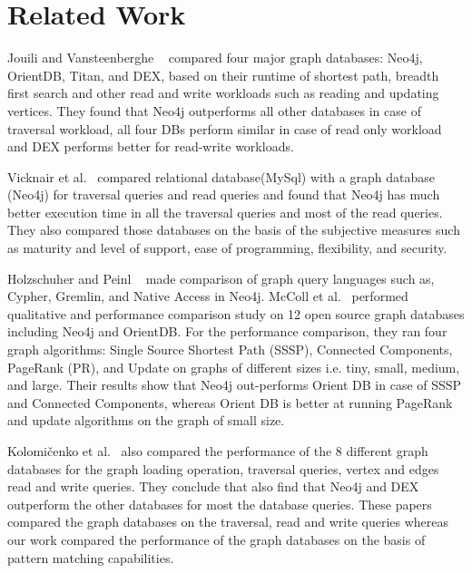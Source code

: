 
\section{Related Work}

Jouili and Vansteenberghe ~\cite{jouili2013empirical} compared four major graph databases: Neo4j, OrientDB, Titan, and DEX, based on their runtime of shortest path, breadth first search and other read and write workloads such as reading and updating vertices. They found that Neo4j outperforms all other databases in case of traversal workload, all four DBs perform similar in case of read only workload and DEX performs better for read-write workloads.

Vicknair et al.~\cite{vicknair2010comparison} compared relational database(MySql) with a graph database (Neo4j) for traversal queries and read queries and found that Neo4j has much better execution time in all the traversal queries and most of the read queries. They also compared those databases on the basis of the subjective measures such as maturity and level of support, ease of programming, flexibility, and security.

Holzschuher and Peinl ~\cite{holzschuher2013performance} made comparison of graph query languages such as, Cypher, Gremlin, and Native Access in Neo4j.  
McColl et al.~\cite{mccoll2014performance} performed qualitative and performance comparison study on 12 open source graph databases including Neo4j and OrientDB. For the performance comparison, they ran four graph algorithms: Single Source Shortest Path (SSSP), Connected Components, PageRank (PR), and Update on graphs of different sizes i.e. tiny, small, medium, and large. Their results show that Neo4j out-performs Orient DB in case of SSSP and Connected Components, whereas Orient DB is better at running PageRank and update algorithms on the graph of small size.

Kolomičenko et al.~\cite{kolomivcenko2013experimental} also compared the performance of the 8 different graph databases for the graph loading operation, traversal queries, vertex and edges read and write queries. They conclude that also find that Neo4j and DEX outperform the other databases for most the database queries. These papers compared the graph databases on the traversal, read and write queries whereas our work compared the performance of the graph databases on the basis of pattern matching capabilities.

